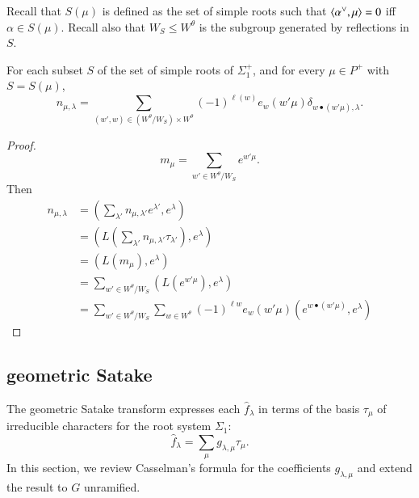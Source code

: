 Recall that $S(\mu)$ is defined as the set of simple roots
such that 
$\langle{\alpha^\vee,\mu}\rangle=0$ iff $\alpha\in S(\mu)$.
%
Recall also that $W_S\le W^\theta$ is the subgroup generated by reflections in $S$.

\begin{lemma}  For each subset $S$ of the set of simple roots of $\Sigma^+_1$,
and for every $\mu\in P^+$ with $S = S(\mu)$,
\[
n_{\mu,\lambda}=\sum_{(w',w)\in (W^\theta/W_S)\times W^\theta} (-1)^{\ell(w)} e_w(w'\mu) \delta_{w\bullet (w'\mu),\lambda}. 
\]
\end{lemma}

\begin{proof}  
\[
m_\mu = \sum_{w'\in W^\theta/W_S} e^{w' \mu}.
\]
Then
\begin{align*}
n_{\mu,\lambda} 
    &= (\sum_{\lambda'} n_{\mu,{\lambda'}} e^{\lambda'},e^\lambda) \\
     &= (L(\sum_{\lambda'} n_{\mu,\lambda'} \tau_{\lambda'}),e^\lambda) \\
     &= (L(m_\mu),e^\lambda) \\
     &= \sum_{w'\in W^\theta/W_S} (L(e^{w'\mu}),e^\lambda)\\
     &= \sum_{w'\in W^\theta/W_S} \sum_{w\in W^\theta} (-1)^{\ell w} e_w(w'\mu) (e^{w\bullet (w'\mu)},e^\lambda)
\end{align*}
\end{proof}

\subsection{geometric Satake}


The geometric Satake transform expresses each $\hat f_\lambda$ in terms of the basis $\tau_\mu$ of irreducible
characters for the root system $\Sigma_1$:
\begin{equation}\label{eqn:geometric-satake}
\hat f_\lambda = \sum_\mu g_{\lambda,\mu} \tau_\mu.
\end{equation}
In this section, we review Casselman's formula for the coefficients $g_{\lambda,\mu}$ 
and extend the result to $G$ unramified.

